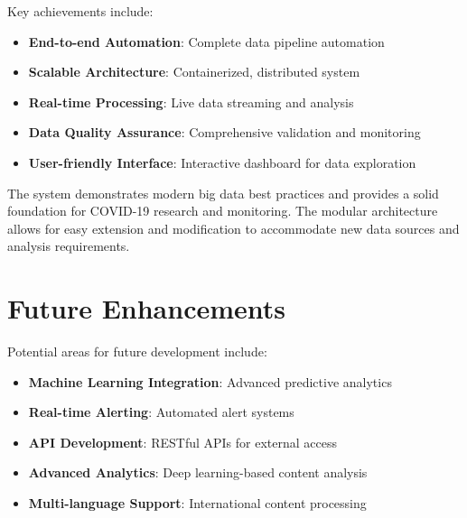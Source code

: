 \documentclass[12pt,a4paper]{article}
\begin{document}
Key achievements include:
\begin{itemize}
    \item \textbf{End-to-end Automation}: Complete data pipeline automation
    \item \textbf{Scalable Architecture}: Containerized, distributed system
    \item \textbf{Real-time Processing}: Live data streaming and analysis
    \item \textbf{Data Quality Assurance}: Comprehensive validation and monitoring
    \item \textbf{User-friendly Interface}: Interactive dashboard for data exploration
\end{itemize}

The system demonstrates modern big data best practices and provides a solid foundation for COVID-19 research and monitoring. The modular architecture allows for easy extension and modification to accommodate new data sources and analysis requirements.

\section{Future Enhancements}

Potential areas for future development include:
\begin{itemize}
    \item \textbf{Machine Learning Integration}: Advanced predictive analytics
    \item \textbf{Real-time Alerting}: Automated alert systems
    \item \textbf{API Development}: RESTful APIs for external access
    \item \textbf{Advanced Analytics}: Deep learning-based content analysis
    \item \textbf{Multi-language Support}: International content processing
\end{itemize}
\end{document}
